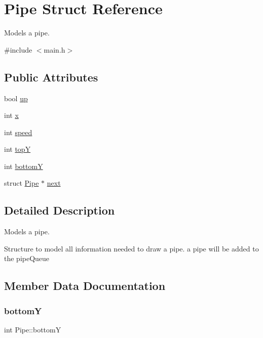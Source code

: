 \hypertarget{struct_pipe}{}\section{Pipe Struct Reference}
\label{struct_pipe}


Models a pipe.  




{\ttfamily \#include $<$main.\+h$>$}

\subsection*{Public Attributes}
\begin{DoxyCompactItemize}
\item 
bool \hyperlink{struct_pipe_a7e5ae0dd02b0eda1da8c877e7fefa997}{up}
\item 
int \hyperlink{struct_pipe_ad9a022a035c93f68117d6b671a57a68b}{x}
\item 
int \hyperlink{struct_pipe_a94d42f9c582423433b7039466579a493}{speed}
\item 
int \hyperlink{struct_pipe_a33248541bebc39fb7e699a495ac2efee}{topY}
\item 
int \hyperlink{struct_pipe_aa6f12d7f544f90d50fde8f728730a59c}{bottomY}
\item 
struct \hyperlink{struct_pipe}{Pipe} $\ast$ \hyperlink{struct_pipe_a98ef5d289100cfe967a4db2c83b8b7d1}{next}
\end{DoxyCompactItemize}


\subsection{Detailed Description}
Models a pipe. 

Structure to model all information needed to draw a pipe. a pipe will be added to the pipe\+Queue 

\subsection{Member Data Documentation}
\mbox{\label{struct_pipe_aa6f12d7f544f90d50fde8f728730a59c}} 
\subsubsection{\texorpdfstring{bottomY}{bottomY}}
{\footnotesize\ttfamily int Pipe\+::bottomY}

